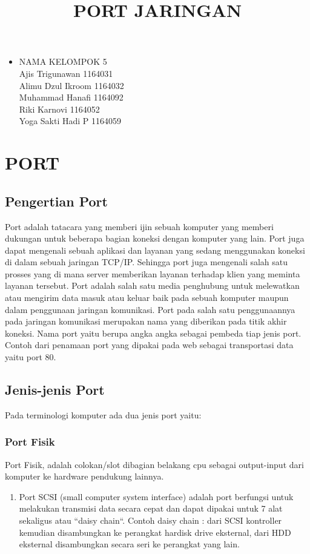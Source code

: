 \documentclass[12pt,a4paper]{article}
\begin{document}
\title{PORT JARINGAN}
\date{}
\maketitle

\begin{itemize}
\item
NAMA KELOMPOK 5\\
Ajis Trigunawan			1164031\\
Alimu Dzul Ikroom		1164032\\
Muhammad Hanafi			1164092\\
Riki Karnovi			1164052\\
Yoga Sakti Hadi P		1164059\\
\end{itemize}

\section{PORT}
\subsection{Pengertian Port}
\hspace{1cm}
Port adalah tatacara yang memberi ijin sebuah komputer yang memberi dukungan untuk beberapa bagian koneksi dengan komputer yang lain. Port juga dapat mengenali sebuah aplikasi dan layanan yang sedang menggunakan koneksi di dalam sebuah jaringan TCP/IP. Sehingga port juga mengenali salah satu prosses yang di mana server memberikan layanan terhadap klien yang meminta layanan tersebut. Port adalah salah satu media penghubung untuk melewatkan atau mengirim data masuk atau keluar baik pada sebuah komputer maupun dalam penggunaan jaringan komunikasi. Port pada salah satu penggunaannya pada jaringan komunikasi merupakan nama yang diberikan pada titik akhir koneksi. Nama port yaitu berupa angka angka sebagai pembeda tiap  jenis port. Contoh dari penamaan port yang dipakai pada web sebagai transportasi data yaitu port 80.


\subsection{Jenis-jenis Port}
Pada terminologi komputer ada dua jenis port yaitu:
\subsubsection {Port Fisik}
Port Fisik, adalah colokan/slot dibagian belakang cpu sebagai output-input dari komputer ke hardware pendukung lainnya. 
\begin{enumerate}
\item Port SCSI (small computer system interface) adalah port berfungsi untuk melakukan transmisi data secara cepat dan dapat dipakai untuk 7 alat sekaligus atau “daisy chain“. Contoh daisy chain : dari SCSI kontroller kemudian disambungkan ke perangkat hardisk drive eksternal, dari HDD eksternal disambungkan secara seri ke perangkat yang lain.
\end{enumerate}
\end{document}
